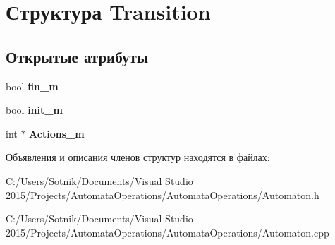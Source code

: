 \hypertarget{struct_transition}{}\section{Структура Transition}
\label{struct_transition}
\subsection*{Открытые атрибуты}
\begin{DoxyCompactItemize}
\item 
\mbox{\label{struct_transition_af8ecd5815dc5265fb504181ee55cb002}} 
bool {\bfseries fin\+\_\+m}
\item 
\mbox{\label{struct_transition_a406cf75228efd251cb3935e1f8597f8e}} 
bool {\bfseries init\+\_\+m}
\item 
\mbox{\label{struct_transition_a2dc8afb9a11bbc4971d2fd7fac542278}} 
int $\ast$ {\bfseries Actions\+\_\+m}
\end{DoxyCompactItemize}


Объявления и описания членов структур находятся в файлах\+:\begin{DoxyCompactItemize}
\item 
C\+:/\+Users/\+Sotnik/\+Documents/\+Visual Studio 2015/\+Projects/\+Automata\+Operations/\+Automata\+Operations/Automaton.\+h\item 
C\+:/\+Users/\+Sotnik/\+Documents/\+Visual Studio 2015/\+Projects/\+Automata\+Operations/\+Automata\+Operations/Automaton.\+cpp\end{DoxyCompactItemize}
